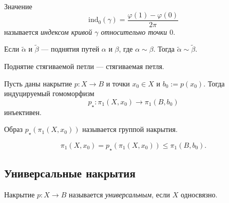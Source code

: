 \documentclass[12pt,a4paper]{article}
\newcommand{\ind}{\ensuremath{\mathrm{ind}}\xspace}
\begin{document}
    \begin{definition}
        Значение
        \[\ind_0(\gamma) = \frac{\varphi(1) - \varphi(0)}{2\pi}\]
        называется \emph{индексом кривой $\gamma$ относительно точки $0$}.
    \end{definition}

    \begin{theorem}
    \end{theorem}

    \begin{corollary}
        Если $\tilde{\alpha}$ и $\tilde{\beta}$ --- поднятия путей $\alpha$ и $\beta$, где $\alpha \sim \beta$. Тогда $\tilde{\alpha} \sim \tilde{\beta}$.
    \end{corollary}

    \begin{corollary}
        Поднятие стягиваемой петли --- стягиваемая петля.
    \end{corollary}

    \begin{corollary}
        Пусть даны накрытие $p: X \to B$ и точки $x_0 \in X$ и $b_0 := p(x_0)$. Тогда индуцируемый гомоморфизм
        \[p_\star: \pi_1(X, x_0) \to \pi_1(B, b_0)\]
        инъективен.
    \end{corollary}

    \begin{definition}
        Образ $p_\star(\pi_1(X, x_0))$ называется группой накрытия.
    \end{definition}

    \begin{remark}
        \[\pi_1(X, x_0) = p_\star(\pi_1(X, x_0)) \leqslant \pi_1(B, b_0).\]
    \end{remark}

    \subsection{Универсальные накрытия}

    \begin{definition}
        Накрытие $p: X \to B$ называется \emph{универсальным}, если $X$ односвязно.
    \end{definition}
\end{document}
